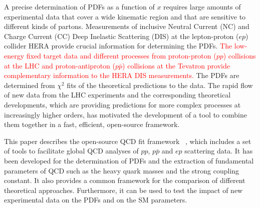 A precise determination of PDFs as a function of $x$ requires large amounts of
experimental data that cover a wide kinematic region and that are sensitive to different kinds of partons. Measurements of inclusive Neutral Current (NC) and Charge Current (CC) Deep Inelastic Scattering (DIS) at the lepton-proton ($ep$) collider HERA provide crucial information for determining the PDFs. 
\textcolor{red}{
The low-energy fixed target data and different processes from proton-proton ($pp$) collisions at the LHC 
and proton-antiproton ($p \bar p$) collisions at the Tevatron provide complementary information to the HERA DIS measurements.
}
 The PDFs are determined
from $\chi^2$ fits of the theoretical predictions to the 
data. 
The rapid flow of new data from the LHC experiments and the corresponding theoretical developments, which are providing predictions for more complex processes at increasingly higher orders, has motivated the development of a tool to combine them  together in a fast, efficient, open-source framework.
%

This paper describes the open-source QCD fit framework \fitter~\cite{herafitter:page}, which includes a set of tools to facilitate global 
QCD analyses of $pp$, $p\bar{p}$ and $ep$ scattering data. 
It has been developed for the determination of PDFs and the extraction of fundamental parameters of QCD such as the heavy
quark masses and the strong coupling constant. It also provides a common framework for the
comparison of different theoretical approaches. Furthermore, it can be used to test the impact 
of new experimental data on the PDFs and on the SM parameters.


